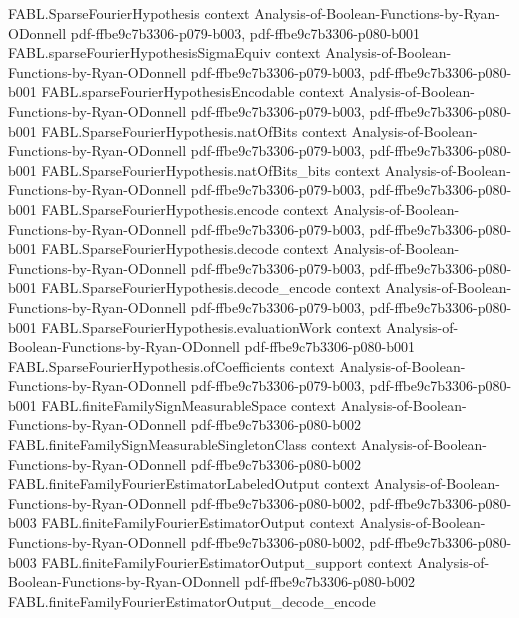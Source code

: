 \begin{theorem}
  {FABL.SparseFourierHypothesis}
  {context}
  {Analysis-of-Boolean-Functions-by-Ryan-ODonnell}
  {pdf-ffbe9c7b3306-p079-b003,
    pdf-ffbe9c7b3306-p080-b001}
\proofstep
  {FABL.sparseFourierHypothesisSigmaEquiv}
  {context}
  {Analysis-of-Boolean-Functions-by-Ryan-ODonnell}
  {pdf-ffbe9c7b3306-p079-b003,
    pdf-ffbe9c7b3306-p080-b001}
\proofstep
  {FABL.sparseFourierHypothesisEncodable}
  {context}
  {Analysis-of-Boolean-Functions-by-Ryan-ODonnell}
  {pdf-ffbe9c7b3306-p079-b003,
    pdf-ffbe9c7b3306-p080-b001}
\proofstep
  {FABL.SparseFourierHypothesis.natOfBits}
  {context}
  {Analysis-of-Boolean-Functions-by-Ryan-ODonnell}
  {pdf-ffbe9c7b3306-p079-b003,
    pdf-ffbe9c7b3306-p080-b001}
\proofstep
  {FABL.SparseFourierHypothesis.natOfBits_bits}
  {context}
  {Analysis-of-Boolean-Functions-by-Ryan-ODonnell}
  {pdf-ffbe9c7b3306-p079-b003,
    pdf-ffbe9c7b3306-p080-b001}
\proofstep
  {FABL.SparseFourierHypothesis.encode}
  {context}
  {Analysis-of-Boolean-Functions-by-Ryan-ODonnell}
  {pdf-ffbe9c7b3306-p079-b003,
    pdf-ffbe9c7b3306-p080-b001}
\proofstep
  {FABL.SparseFourierHypothesis.decode}
  {context}
  {Analysis-of-Boolean-Functions-by-Ryan-ODonnell}
  {pdf-ffbe9c7b3306-p079-b003,
    pdf-ffbe9c7b3306-p080-b001}
\proofstep
  {FABL.SparseFourierHypothesis.decode_encode}
  {context}
  {Analysis-of-Boolean-Functions-by-Ryan-ODonnell}
  {pdf-ffbe9c7b3306-p079-b003,
    pdf-ffbe9c7b3306-p080-b001}
\proofstep
  {FABL.SparseFourierHypothesis.evaluationWork}
  {context}
  {Analysis-of-Boolean-Functions-by-Ryan-ODonnell}
  {pdf-ffbe9c7b3306-p080-b001}
\proofstep
  {FABL.SparseFourierHypothesis.ofCoefficients}
  {context}
  {Analysis-of-Boolean-Functions-by-Ryan-ODonnell}
  {pdf-ffbe9c7b3306-p079-b003,
    pdf-ffbe9c7b3306-p080-b001}
\proofstep
  {FABL.finiteFamilySignMeasurableSpace}
  {context}
  {Analysis-of-Boolean-Functions-by-Ryan-ODonnell}
  {pdf-ffbe9c7b3306-p080-b002}
\proofstep
  {FABL.finiteFamilySignMeasurableSingletonClass}
  {context}
  {Analysis-of-Boolean-Functions-by-Ryan-ODonnell}
  {pdf-ffbe9c7b3306-p080-b002}
\proofstep
  {FABL.finiteFamilyFourierEstimatorLabeledOutput}
  {context}
  {Analysis-of-Boolean-Functions-by-Ryan-ODonnell}
  {pdf-ffbe9c7b3306-p080-b002,
    pdf-ffbe9c7b3306-p080-b003}
\proofstep
  {FABL.finiteFamilyFourierEstimatorOutput}
  {context}
  {Analysis-of-Boolean-Functions-by-Ryan-ODonnell}
  {pdf-ffbe9c7b3306-p080-b002,
    pdf-ffbe9c7b3306-p080-b003}
\proofstep
  {FABL.finiteFamilyFourierEstimatorOutput_support}
  {context}
  {Analysis-of-Boolean-Functions-by-Ryan-ODonnell}
  {pdf-ffbe9c7b3306-p080-b002}
\proofstep
  {FABL.finiteFamilyFourierEstimatorOutput_decode_encode}

\end{theorem}
